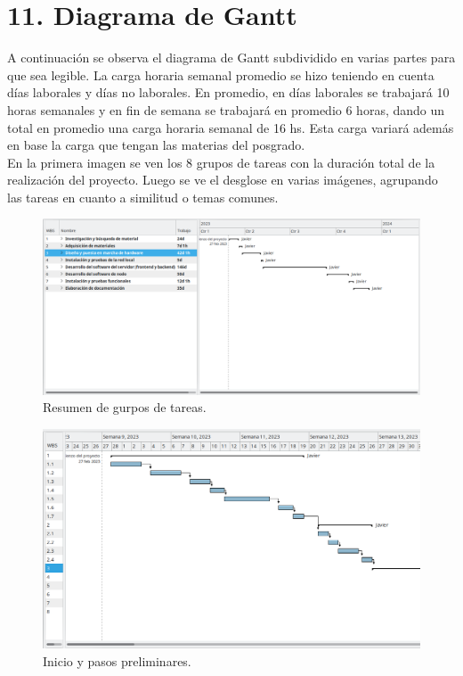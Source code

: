 \documentclass[
11pt, %
]{charter}
\begin{document}
\section{11. Diagrama de Gantt}
\label{sec:gantt}

A continuación se observa el diagrama de Gantt subdividido en varias partes para que sea legible. La carga horaria semanal promedio se hizo teniendo en cuenta días laborales y días no laborales. En promedio, en días laborales se trabajará 10 horas semanales y en fin de semana se trabajará en promedio 6 horas, dando un total en promedio una carga horaria semanal de 16 hs. Esta carga variará además en base la carga que tengan las materias del posgrado.\\
En la primera imagen se ven los 8 grupos de tareas con la duración total de la realización del proyecto. Luego se ve el desglose en varias imágenes, agrupando las tareas en cuanto a similitud o temas comunes.

\begin{landscape}
\begin{figure}[htpb]
\centering 
\includegraphics[height=.7\textheight]{./Figuras/Gantt_resumen.png}
\caption{Resumen de gurpos de tareas.}
\label{fig:diagGantt}
\end{figure}
\end{landscape}

\begin{landscape}
\begin{figure}[htpb]
\centering 
\includegraphics[height=.7\textheight]{./Figuras/Gantt_1-2.png}
\caption{Inicio y pasos preliminares.}
\label{fig:diagGantt}
\end{figure}
\end{landscape}
\end{document}
